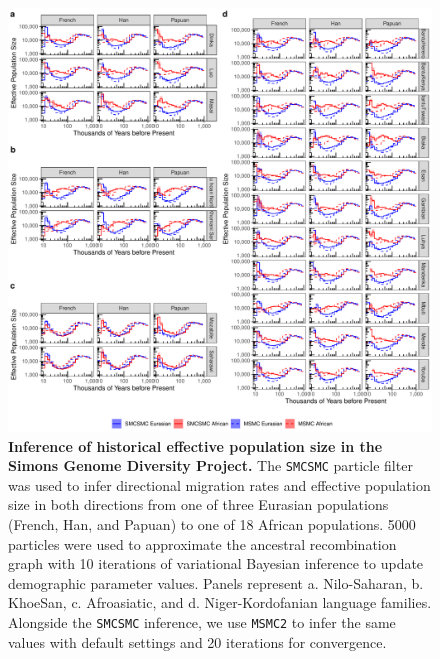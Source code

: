 \documentclass{article}
\begin{document}


\begin{figure}[p!]
	\centering
	\includegraphics[width=0.95\linewidth]{plot/sgdp_ne_new.pdf}
	\caption{{\bf Inference of historical effective population size in the Simons Genome Diversity Project.} The {\tt SMCSMC} particle filter was used to infer directional migration rates and effective population size in both directions from one of three Eurasian populations (French, Han, and Papuan) to one of 18 African populations. 5000 particles were used to approximate the ancestral recombination graph with 10 iterations of variational Bayesian inference to update demographic parameter values. Panels represent a. Nilo-Saharan, b. KhoeSan, c. Afroasiatic, and d. Niger-Kordofanian language families. Alongside the {\tt SMCSMC} inference, we use {\tt MSMC2} to infer the same values with default settings and 20 iterations for convergence.}	
	\label{sgdp_ne}
\end{figure}
\newpage
\end{document}
